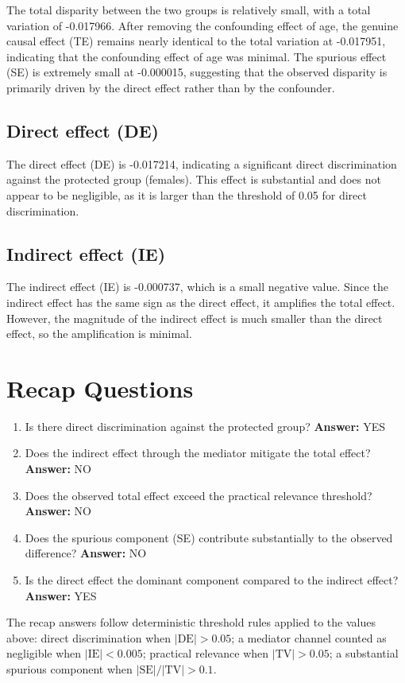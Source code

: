 \documentclass[11pt]{article}
\begin{document}
The total disparity between the two groups is relatively small, with a total variation of -0.017966. After removing the confounding effect of age, the genuine causal effect (TE) remains nearly identical to the total variation at -0.017951, indicating that the confounding effect of age was minimal. The spurious effect (SE) is extremely small at -0.000015, suggesting that the observed disparity is primarily driven by the direct effect rather than by the confounder.

\subsection{Direct effect (DE)}

The direct effect (DE) is -0.017214, indicating a significant direct discrimination against the protected group (females). This effect is substantial and does not appear to be negligible, as it is larger than the threshold of 0.05 for direct discrimination.

\subsection{Indirect effect (IE)}

The indirect effect (IE) is -0.000737, which is a small negative value. Since the indirect effect has the same sign as the direct effect, it amplifies the total effect. However, the magnitude of the indirect effect is much smaller than the direct effect, so the amplification is minimal.

\section{Recap Questions}

\begin{enumerate}
\item Is there direct discrimination against the protected group? \textbf{Answer:} YES
\item Does the indirect effect through the mediator mitigate the total effect? \textbf{Answer:} NO
\item Does the observed total effect exceed the practical relevance threshold? \textbf{Answer:} NO
\item Does the spurious component (SE) contribute substantially to the observed difference? \textbf{Answer:} NO
\item Is the direct effect the dominant component compared to the indirect effect? \textbf{Answer:} YES
\end{enumerate}

\vspace{1em}
\noindent\footnotesize
The recap answers follow deterministic threshold rules applied to the values above: direct discrimination when $|\mathrm{DE}| > 0.05$; a mediator channel counted as negligible when $|\mathrm{IE}| < 0.005$; practical relevance when $|\mathrm{TV}| > 0.05$; a substantial spurious component when $|\mathrm{SE}| / |\mathrm{TV}| > 0.1$.
\end{document}
